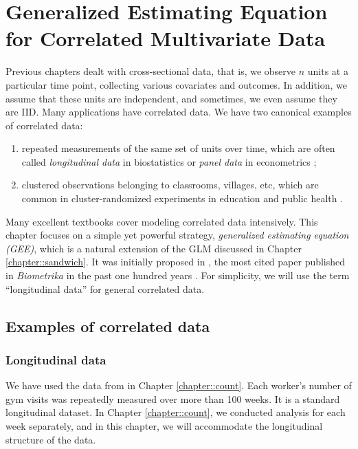  
\chapter{Generalized Estimating Equation for Correlated Multivariate Data}\label{chapter::gee}
 
Previous chapters dealt with cross-sectional data, that is, we observe $n$ units at a particular time point, collecting various covariates and outcomes. In addition, we assume that these units are independent, and sometimes, we even assume they are IID. Many applications have correlated data. We have two canonical examples of correlated data:  
\begin{enumerate}[label=(E\arabic*), ref=E\arabic*]
\item
repeated measurements of the same set of units over  time, which are often called {\it longitudinal data} in biostatistics \citep{fitzmaurice2012applied} or {\it panel data} in econometrics \citep{wooldridge2010econometric};  
\item
clustered observations belonging to classrooms, villages, etc, which are common in cluster-randomized experiments in education \citep{schochet2013estimators} and public health \citep{turner2017reviewdesign, turner2017reviewanalysis}. 
\end{enumerate}
Many excellent textbooks cover modeling correlated data intensively. This chapter focuses on a simple yet powerful strategy, {\it generalized estimating equation (GEE)},  which is a natural extension of the GLM discussed in Chapter \ref{chapter::sandwich}. It was initially proposed in \citet{liang1986longitudinal}, the most cited paper published in {\it Biometrika} in the past one hundred years \citep{titterington2013biometrika}. 
For simplicity, we will use the term ``longitudinal data'' for general correlated data. 



 
 
\section{Examples of correlated data} 
 
 
 
\subsection{Longitudinal data}
\label{section::longitudinal-gym}

We have used the data from \citet{royer2015incentives} in Chapter \ref{chapter::count}. Each worker's number of gym visits was repeatedly measured over more than 100 weeks. It is a standard longitudinal dataset. In Chapter \ref{chapter::count}, we conducted analysis for each week separately, and in this chapter, we will accommodate the longitudinal structure of the data. 



